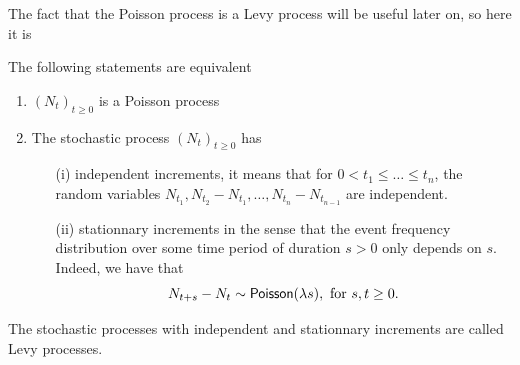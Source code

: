 The fact that the Poisson process is a Levy process will be useful later on, so here it is
\begin{prop}
The following statements are equivalent
\begin{enumerate}
\item $(N_t)_{t\geq 0}$ is a Poisson process
\item The stochastic process $(N_t)_{t\geq 0}$ has
\begin{itemize}
\item[(i)] independent increments, it means that for $0<t_1\leq\ldots\leq t_n$, the random variables
$N_{t_1},N_{t_2}-N_{t_1},\ldots,N_{t_{n}}-N_{t_{n-1}}$
are independent.
\item[(ii)] stationnary increments in the sense that the event frequency distribution over some time period of duration $s>0$ only depends on $s$. Indeed, we have that 
$$
N_{t+s}-N_t\sim\mathsf{Poisson}(\lambda s),\text{ for }s,t\geq 0.
$$
\end{itemize}
\end{enumerate}
The stochastic processes with independent and stationnary increments are called Levy processes.
\end{prop}
